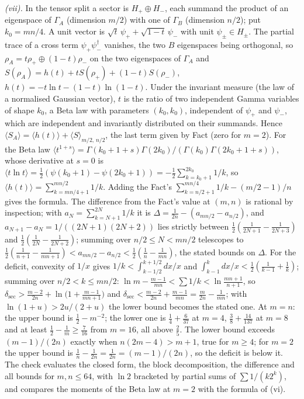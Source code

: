 \emph{(vii).} In the tensor split a sector is $H_{+} \oplus H_{-}$, each summand the product of an eigenspace of $\Gamma_{A}$ (dimension $m/2$) with one of $\Gamma_{B}$ (dimension $n/2$); put $k_{0} = mn/4$. A unit vector is $\sqrt{t}\,\psi_{+} + \sqrt{1-t}\,\psi_{-}$ with unit $\psi_{\pm} \in H_{\pm}$. The partial trace of a cross term $\psi_{+}\psi_{-}^{\dagger}$ vanishes, the two $B$ eigenspaces being orthogonal, so $\rho_{A} = t\rho_{+} \oplus (1-t)\rho_{-}$ on the two eigenspaces of $\Gamma_{A}$ and $S(\rho_{A}) = h(t) + tS(\rho_{+}) + (1-t)S(\rho_{-})$, $h(t) = -t\ln t - (1-t)\ln(1-t)$. Under the invariant measure (the law of a normalised Gaussian vector), $t$ is the ratio of two independent Gamma variables of shape $k_{0}$, a Beta law with parameters $(k_{0}, k_{0})$, independent of $\psi_{+}$ and $\psi_{-}$, which are independent and invariantly distributed on their summands. Hence $\langle S_{A}\rangle = \langle h(t)\rangle + \langle S\rangle_{m/2,\,n/2}$, the last term given by Fact  (zero for $m = 2$). For the Beta law $\langle t^{1+s}\rangle = \Gamma(k_{0}+1+s)\Gamma(2k_{0})/(\Gamma(k_{0})\Gamma(2k_{0}+1+s))$, whose derivative at $s = 0$ is $\langle t\ln t\rangle = \tfrac12(\psi(k_{0}+1) - \psi(2k_{0}+1)) = -\tfrac12\sum_{k=k_{0}+1}^{2k_{0}}1/k$, so $\langle h(t)\rangle = \sum_{k=mn/4+1}^{mn/2}1/k$. Adding the Fact's $\sum_{k=n/2+1}^{mn/4}1/k - (m/2 - 1)/n$ gives the formula. The difference from the Fact's value at $(m,n)$ is rational by inspection; with $a_{N} = \sum_{k=N+1}^{2N}1/k$ it is $\Delta = \tfrac{1}{2n} - (a_{mn/2} - a_{n/2})$, and $a_{N+1} - a_{N} = 1/((2N+1)(2N+2))$ lies strictly between $\tfrac12(\tfrac{1}{2N+1} - \tfrac{1}{2N+3})$ and $\tfrac12(\tfrac{1}{2N} - \tfrac{1}{2N+2})$; summing over $n/2 \le N < mn/2$ telescopes to $\tfrac12(\tfrac{1}{n+1} - \tfrac{1}{mn+1}) < a_{mn/2} - a_{n/2} < \tfrac12(\tfrac1n - \tfrac{1}{mn})$, the stated bounds on $\Delta$. For the deficit, convexity of $1/x$ gives $1/k < \int_{k-1/2}^{k+1/2}dx/x$ and $\int_{k-1}^{k}dx/x < \tfrac12(\tfrac{1}{k-1} + \tfrac1k)$; summing over $n/2 < k \le mn/2$: $\ln m - \tfrac{m-1}{mn} < \sum 1/k < \ln\frac{mn+1}{n+1}$, so $\delta_{\mathrm{sec}} > \tfrac{m-2}{2n} + \ln\bigl(1 + \tfrac{m-1}{mn+1}\bigr)$ and $\delta_{\mathrm{sec}} < \tfrac{m-2}{2n} + \tfrac{m-1}{mn} = \tfrac{m}{2n} - \tfrac{1}{mn}$; with $\ln(1+u) > 2u/(2+u)$ the lower bound becomes the stated one. At $m = n$: the upper bound is $\tfrac12 - m^{-2}$; the lower one is $\tfrac14 + \tfrac{6}{37}$ at $m = 4$, $\tfrac38 + \tfrac{14}{137}$ at $m = 8$ and at least $\tfrac12 - \tfrac1m \ge \tfrac{7}{16}$ from $m = 16$, all above $\tfrac25$. The lower bound exceeds $(m-1)/(2n)$ exactly when $n(2m - 4) > m + 1$, true for $m \ge 4$; for $m = 2$ the upper bound is $\tfrac{1}{n} - \tfrac{1}{2n} = \tfrac{1}{2n} = (m-1)/(2n)$, so the deficit is below it. The check evaluates the closed form, the block decomposition, the difference and all bounds for $m, n \le 64$, with $\ln 2$ bracketed by partial sums of $\sum 1/(k2^{k})$, and compares the moments of the Beta law at $m = 2$ with the formula of (vi).

